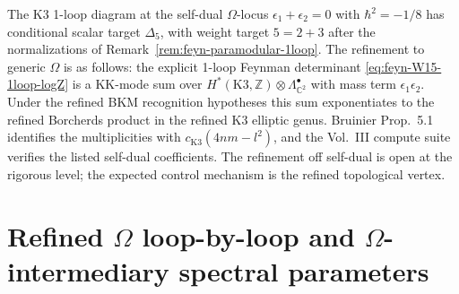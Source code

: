 \begin{remark}
\label{rem:feyn-W15-summary}
The K3 1-loop diagram at the self-dual $\Omega$-locus
$\epsilon_1 + \epsilon_2 = 0$ with $\hbar^2 = -1/8$ has conditional
scalar target $\Delta_5$, with weight target $5 = 2 + 3$ after the
normalizations of Remark~\ref{rem:feyn-paramodular-1loop}. The refinement to generic
$\Omega$ is as follows: the explicit 1-loop Feynman determinant
\eqref{eq:feyn-W15-1loop-logZ} is a KK-mode sum over
$H^*(\mathrm{K3}, \mathbb Z) \otimes \Lambda^\bullet_{\mathbb C^2}$ with
mass term $\epsilon_1\epsilon_2$.  Under the refined BKM recognition
hypotheses this sum exponentiates to the refined Borcherds product in
the refined K3 elliptic genus.  Bruinier
Prop.~5.1 identifies the multiplicities with
$c_{\mathrm K3}(4nm-l^2)$, and the Vol.~III compute suite verifies the
listed self-dual coefficients.  The refinement off self-dual is open at
the rigorous level; the expected control mechanism is the refined
topological vertex.
\end{remark}

\section{Refined \texorpdfstring{$\Omega$}{Omega} loop-by-loop and \texorpdfstring{$\Omega$}{Omega}-intermediary spectral parameters}
\label{sec:feyn-supplement-iii}

